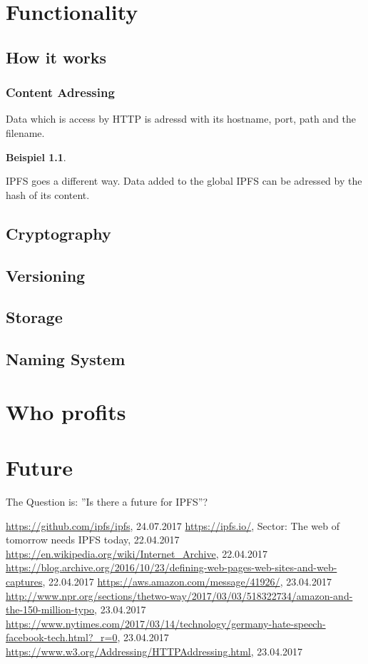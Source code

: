 \documentclass[a4paper,11pt, oneside]{report}
\theoremstyle{definition}
\newtheorem{exmp}{Beispiel}[subsection]
\begin{document}
\chapter{Functionality}
\section{How it works}
\subsection{Content Adressing}
Data which is access by HTTP is adressd with its hostname, port, path and the filename.
\begin{exmp}

\end{exmp}
\noindent
IPFS goes a different way. Data added to the global IPFS can be adressed by the hash of its content.

\section{Cryptography}
\section{Versioning}
\section{Storage}
\section{Naming System}

\chapter{Who profits}

\chapter{Future}
The Question is: ''Is there a future for IPFS''?



\begin{thebibliography}{1}
 \url{https://github.com/ipfs/ipfs}, 24.07.2017
 \url{https://ipfs.io/}, Sector: The web of tomorrow needs IPFS today, 22.04.2017
 \url{https://en.wikipedia.org/wiki/Internet_Archive}, 22.04.2017
 \url{https://blog.archive.org/2016/10/23/defining-web-pages-web-sites-and-web-captures}, 22.04.2017
 \url{https://aws.amazon.com/message/41926/}, 23.04.2017
 \url{http://www.npr.org/sections/thetwo-way/2017/03/03/518322734/amazon-and-the-150-million-typo}, 23.04.2017
 \url{https://www.nytimes.com/2017/03/14/technology/germany-hate-speech-facebook-tech.html?_r=0}, 23.04.2017
 \url{https://www.w3.org/Addressing/HTTPAddressing.html}, 23.04.2017 
 
\end{thebibliography}
\end{document}
